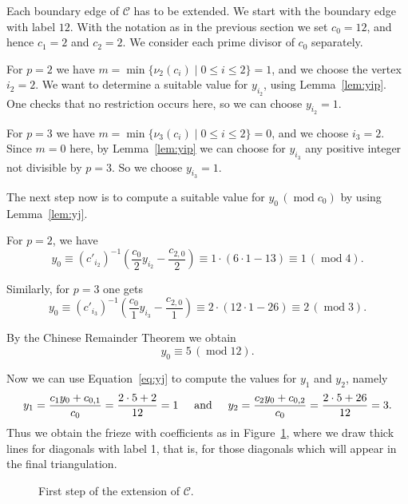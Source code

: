 \documentclass[10pt]{amsart}
\numberwithin{equation}{section}
\theoremstyle{definition}
\theoremstyle{remark}
\DeclareMathOperator{\md}{mod}
\begin{document}
Each boundary edge of $\mathcal{C}$ has to be extended. We start with the boundary edge
with label $12$. With the notation as in the previous section we set $c_0=12$, and hence
$c_1=2$ and $c_2=2$. We consider each prime divisor of $c_0$ separately. 

For $p=2$ we have $m=\min\{\nu_2(c_i)\mid 0\le i\le 2\}=1$, and we choose the vertex
$i_2=2$.
We want to determine a suitable value for $y_{i_2}$, using Lemma~\ref{lem:yip}.
One checks that no restriction occurs here, so we can choose 
$y_{i_2}=1$.


For $p=3$ we have $m=\min\{\nu_3(c_i)\mid 0\le i\le 2\}=0$, and we choose $i_3=2$. Since $m=0$ here, by Lemma~\ref{lem:yip}
we can choose for $y_{i_3}$
any positive integer not divisible by $p=3$. 
So we choose 
$y_{i_3}=1$.

The next step now is to compute a suitable value for 
$y_{0}\,(\md c_0)$ by using
Lemma~\ref{lem:yj}.

For $p=2$, we have
\[
y_0 \equiv (c'_{i_2})^{-1} \left( \frac{c_0}{2} y_{i_2} - \frac{c_{2,0}}{2}\right)
\equiv 1\cdot (6\cdot 1 - 13) \equiv 1 \,(\md 4).
\]

Similarly, for $p=3$ one gets
\[
y_0 \equiv (c'_{i_3})^{-1} \left( \frac{c_0}{1} y_{i_3} - \frac{c_{2,0}}{1}\right)
\equiv 2\cdot (12\cdot 1 - 26) \equiv 2 \,(\md 3).
\]

By the Chinese Remainder Theorem we obtain
\[
y_{0}\equiv 5 \,(\md 12).
\]

Now we can use Equation~\eqref{eq:yj} to compute the values for $y_1$ and $y_2$, namely
\[
y_1=\frac{c_1y_0+c_{0,1}}{c_0} = \frac{2\cdot 5 +2}{12} = 1\hskip0.5cm
\mbox{and}\hskip0.5cm
y_2=\frac{c_2y_0+c_{0,2}}{c_0} = \frac{2\cdot 5 +26}{12} = 3.
\]
Thus we obtain the frieze with coefficients as in Figure~\ref{fig:fwcext1}, where we
draw thick lines for diagonals with label 1, that is, for those diagonals which will
appear in the final triangulation. 



\begin{figure}[htb]\centering
{}

\vspace{-3mm}
 \caption{First step of the extension of $\mathcal{C}$.
 \label{fig:fwcext1}}
\end{figure}
\end{document}
